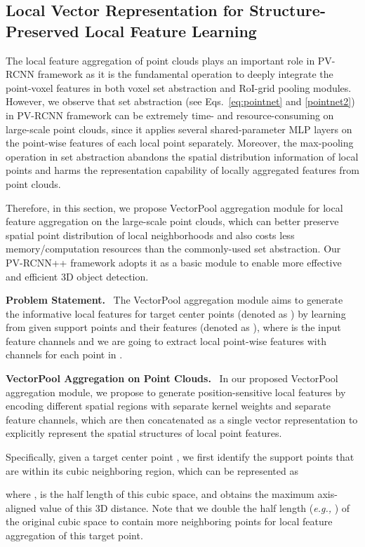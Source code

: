 \documentclass[natbib,twocolumn]{svjour3}          \smartqed  \usepackage{graphicx}
\begin{document}
\subsection{Local Vector Representation for Structure-Preserved Local Feature Learning}
\label{sec:vectorpool}
The local feature aggregation of point clouds plays an important role in PV-RCNN framework as it is the fundamental operation to deeply integrate the point-voxel features in both voxel set abstraction and RoI-grid pooling modules. 
However, we observe that set abstraction (see Eqs.~\eqref{eq:pointnet} and \eqref{pointnet2}) in PV-RCNN framework 
can be extremely time- and resource-consuming on large-scale point clouds, since it applies several shared-parameter MLP layers on the point-wise features of each local point separately. 
Moreover, the max-pooling operation in set abstraction abandons the spatial distribution information of local points and harms the representation capability of locally aggregated features from point clouds.


Therefore, in this section, we propose VectorPool aggregation module for local feature aggregation on the large-scale point clouds, 
which can better preserve spatial point distribution of local neighborhoods and also costs less memory/computation resources than the commonly-used set abstraction. 
Our PV-RCNN++ framework adopts it as a basic module to enable more effective and efficient 3D object detection.

\noindent
\textbf{Problem Statement.}~
The VectorPool aggregation module aims to generate the informative local features for  target center points (denoted as ) by learning from  given support points and their features (denoted as  ), where   is the input feature channels and we are going to extract  local point-wise features with  channels for each point in .



\noindent
\textbf{VectorPool Aggregation on Point Clouds.}~
In our proposed VectorPool aggregation module, we propose to generate position-sensitive local features by encoding different spatial regions  with separate kernel weights and separate feature channels, which are then concatenated as a single vector representation to explicitly represent the spatial structures of local point features. 

Specifically, given a target center point , we first identify the support points that are within its cubic neighboring region, which can be represented as  

where ,  is the half length of this cubic space, and  obtains the maximum axis-aligned value of this 3D distance. 
Note that we double the half length (\emph{e.g.,} ) of the original cubic space to contain more neighboring points for local feature aggregation of this target point. 
\end{document}
